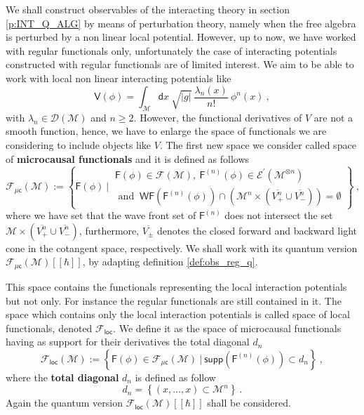 \documentclass[11pt]{book}
\newcommand{\supp}{\mathsf{supp}}
\newcommand{\WF}{\mathsf{WF}}
\newcommand{\loc}{\mathsf{loc}}
\newcommand{\muc}{\mu\csf}
\newcommand{\abs}[1]{\left|#1\right|}
\newcommand{\Dcal}{\mathcal{D}}
\newcommand{\Ecal}{\mathcal{E}}
\newcommand{\Fcal}{\mathcal{F}}
\newcommand{\Mcal}{\mathcal{M}}
\newcommand{\Fsf}{\mathsf{F}}
\newcommand{\Vsf}{\mathsf{V}}
\newcommand{\csf}{\mathsf{c}}
\newcommand{\dsf}{\mathsf{d}}
\theoremstyle{break}
\begin{document}
We shall construct observables of the interacting theory in section \ref{p:INT_Q_ALG} by means of perturbation theory, namely when the free algebra is perturbed by a non linear local potential. However, up to now, we have worked with regular functionals only, unfortunately the case of interacting potentials constructed with regular functionals are of limited interest. We aim to be able to work with local non linear interacting potentials like
%
\begin{equation}
\Vsf(\phi) = \int_\Mcal \dsf x \ \sqrt{\abs{g}} \ \frac{\lambda_n(x)}{n!} \ \phi^n(x) \ ,
\label{eq:local_pot}
\end{equation}
%
with $\lambda_n \in \Dcal(\Mcal)$ and $n\geq2$. However, the functional derivatives of $V$ are not a smooth function, hence, we have to enlarge the space of functionals we are considering to include objects like $V$. The first new space we consider called space of \textbf{microcausal functionals} and it is defined as follows
%
\begin{equation}
\Fcal_{\muc}(\Mcal) := \left\{ 
\Fsf(\phi) \ \bigg| \ 
\begin{array}{l}
\Fsf(\phi) \in \Fcal(\Mcal), \ \Fsf^{(n)}(\phi) \in \Ecal^\prime(\Mcal^{\otimes n}) \\
\mbox{ and } \ \WF(\Fsf^{(n)}(\phi)) \cap \left( \Mcal^n \times ( \overline{V^{n}_{+}} \cup \overline{V^{n}_{-}} ) \right)  = \emptyset 
\end{array}
\right\} \ ,
\label{eq:func_micro}
\end{equation}
\index{$\Fcal_{\mu\csf}(\Mcal)$}%
%
where we have set that the wave front set of $\Fsf^{(n)}$ does not intersect the set $\Mcal \times (\overline{V^n_+} \cup \overline{V^n_-})$, furthermore, $\overline{V_\pm}$ denotes the closed forward and backward light cone in the cotangent space, respectively. We shall work with its quantum version $\Fcal_{\muc}(\Mcal)[[\hbar]]$, by adapting definition \ref{def:obs_reg_q}.


This space contains the functionals representing the local interaction potentials but not only. For instance the regular functionals are still contained in it. The space which contains only the local interaction potentials is called space of local functionals, denoted $\mathcal{F}_\loc$. We define it as the space of microcausal functionals having as support for their derivatives the total diagonal $d_n$
%
\begin{equation*}
\Fcal_\loc(\Mcal) := \left\{ \Fsf(\phi) \in \Fcal_{\mu\csf}(\Mcal) \ \bigg| \ \supp\left(\Fsf^{(n)}(\phi)\right) \subset d_n \right\} \ ,
\label{eq:func_loc}
\end{equation*}
\index{$\Fcal_{\mathsf{loc}}(\Mcal)$}
%
where the \textbf{total diagonal} $d_n$ is defined as follow
%
\begin{equation}
d_n = \left\{ (x,\dots,x) \subset \Mcal^n \right\} \ .
\label{eq:total_diag}
\end{equation}
%
Again the quantum version $\Fcal_{\mathsf{loc}}(\Mcal)[[\hbar]]$ shall be considered.
\end{document}
